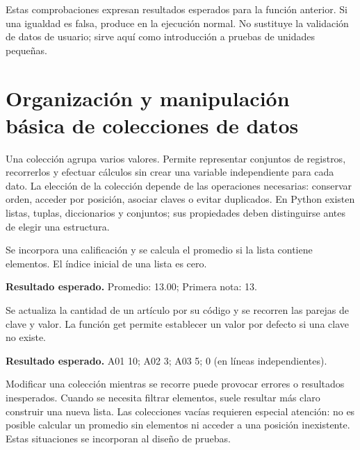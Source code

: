 
Estas comprobaciones expresan resultados esperados para la función anterior. Si una igualdad es falsa,  produce  en la ejecución normal. No sustituye la validación de datos de usuario; sirve aquí como introducción a pruebas de unidades pequeñas.

\section{Organización y manipulación básica de colecciones de datos}

Una colección agrupa varios valores. Permite representar conjuntos de registros, recorrerlos y efectuar cálculos sin crear una variable independiente para cada dato. La elección de la colección depende de las operaciones necesarias: conservar orden, acceder por posición, asociar claves o evitar duplicados. En Python existen listas, tuplas, diccionarios y conjuntos; sus propiedades deben distinguirse antes de elegir una estructura.




Se incorpora una calificación y se calcula el promedio si la lista contiene elementos. El índice inicial de una lista es cero.


\textbf{Resultado esperado.} Promedio: 13.00; Primera nota: 13.


Se actualiza la cantidad de un artículo por su código y se recorren las parejas de clave y valor. La función get permite establecer un valor por defecto si una clave no existe.


\textbf{Resultado esperado.} A01 10; A02 3; A03 5; 0 (en líneas independientes).

Modificar una colección mientras se recorre puede provocar errores o resultados inesperados. Cuando se necesita filtrar elementos, suele resultar más claro construir una nueva lista. Las colecciones vacías requieren especial atención: no es posible calcular un promedio sin elementos ni acceder a una posición inexistente. Estas situaciones se incorporan al diseño de pruebas.


